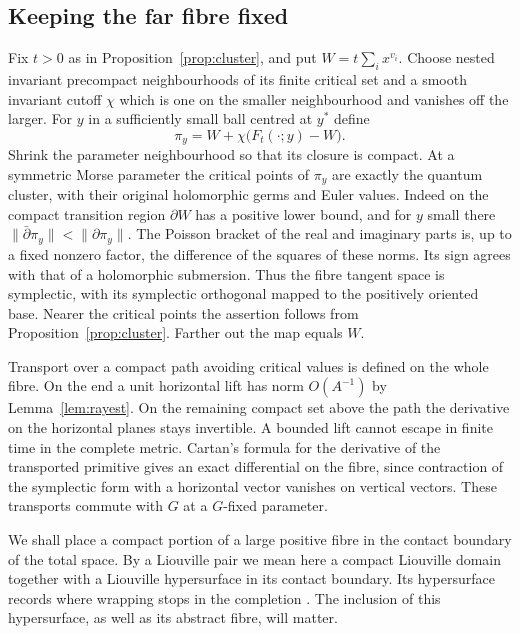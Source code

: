 \subsection{Keeping the far fibre fixed}
Fix $t>0$ as in Proposition~\ref{prop:cluster}, and put $W=t\sum_i x^{v_i}$. Choose nested invariant precompact neighbourhoods of its finite critical set and a smooth invariant cutoff $\chi$ which is one on the smaller neighbourhood and vanishes off the larger. For $y$ in a sufficiently small ball centred at $y^*$ define
\[
                    \pi_y=W+\chi\bigl(F_t(\cdot;y)-W\bigr).
\]
Shrink the parameter neighbourhood so that its closure is compact. At a symmetric Morse parameter the critical points of $\pi_y$ are exactly the quantum cluster, with their original holomorphic germs and Euler values. Indeed on the compact transition region $\partial W$ has a positive lower bound, and for $y$ small there $\|\bar\partial\pi_y\|<\|\partial\pi_y\|$. The Poisson bracket of the real and imaginary parts is, up to a fixed nonzero factor, the difference of the squares of these norms. Its sign agrees with that of a holomorphic submersion. Thus the fibre tangent space is symplectic, with its symplectic orthogonal mapped to the positively oriented base. Nearer the critical points the assertion follows from Proposition~\ref{prop:cluster}. Farther out the map equals $W$.

Transport over a compact path avoiding critical values is defined on the whole fibre. On the end a unit horizontal lift has norm $O(A^{-1})$ by Lemma~\ref{lem:rayest}. On the remaining compact set above the path the derivative on the horizontal planes stays invertible. A bounded lift cannot escape in finite time in the complete metric. Cartan's formula for the derivative of the transported primitive gives an exact differential on the fibre, since contraction of the symplectic form with a horizontal vector vanishes on vertical vectors. These transports commute with $G$ at a $G$-fixed parameter.

We shall place a compact portion of a large positive fibre in the contact boundary of the total space. By a Liouville pair we mean here a compact Liouville domain together with a Liouville hypersurface in its contact boundary. Its hypersurface records where wrapping stops in the completion \cite[Example~3.11]{GPS}. The inclusion of this hypersurface, as well as its abstract fibre, will matter.

